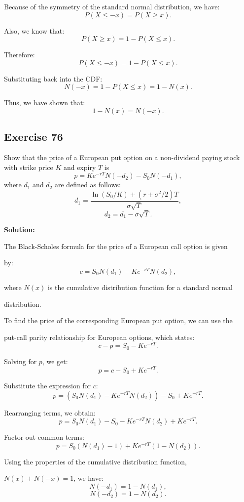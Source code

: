 \documentclass{article}
\begin{document}
Because of the symmetry of the standard normal distribution, we have:
\[
P(X \leq -x) = P(X \geq x).
\]

Also, we know that:
\[
P(X \geq x) = 1 - P(X \leq x).
\]

Therefore:
\[
P(X \leq -x) = 1 - P(X \leq x).
\]

Substituting back into the CDF:
\[
N(-x) = 1 - P(X \leq x) = 1 - N(x).
\]

Thus, we have shown that:
\[
1 - N(x) = N(-x).
\]

\subsection*{Exercise 76}

Show that the price of a European put option on a non-dividend paying stock with strike price \( K \) and expiry \( T \) is
\[
p = Ke^{-rT} N(-d_2) - S_0 N(-d_1),
\]
where \( d_1 \) and \( d_2 \) are defined as follows:
\[
d_1 = \frac{\ln(S_0 / K) + (r + \sigma^2 / 2) T}{\sigma \sqrt{T}},
\]
\[
d_2 = d_1 - \sigma \sqrt{T}.
\]

\textbf{Solution:}

The Black-Scholes formula for the price of a European call option is given 

by:
\[
c = S_0 N(d_1) - Ke^{-rT} N(d_2),
\]

where \( N(x) \) is the cumulative distribution function for a standard normal 

distribution.

\vspace{\baselineskip}

To find the price of the corresponding European put option, we can use the 

put-call parity relationship for European options, which states:
\[
c - p = S_0 - Ke^{-rT}.
\]

Solving for \( p \), we get:
\[
p = c - S_0 + Ke^{-rT}.
\]

Substitute the expression for \( c \):
\[
p = \left( S_0 N(d_1) - Ke^{-rT} N(d_2) \right) - S_0 + Ke^{-rT}.
\]

Rearranging terms, we obtain:
\[
p = S_0 N(d_1) - S_0 - Ke^{-rT} N(d_2) + Ke^{-rT}.
\]

Factor out common terms:
\[
p = S_0 (N(d_1) - 1) + Ke^{-rT} (1 - N(d_2)).
\]

Using the properties of the cumulative distribution function,

\( N(x) + N(-x) = 1 \), we have:
\[
N(-d_1) = 1 - N(d_1),
\]
\[
N(-d_2) = 1 - N(d_2).
\]
\end{document}
